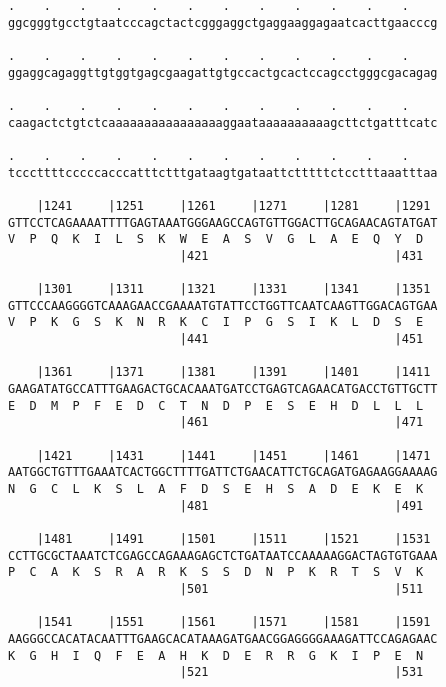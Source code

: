 \documentclass{article}
\begin{document}
\begin{Verbatim}
.    .    .    .    .    .    .    .    .    .    .    .    
ggcgggtgcctgtaatcccagctactcgggaggctgaggaaggagaatcacttgaacccg
                                                            
.    .    .    .    .    .    .    .    .    .    .    .    
ggaggcagaggttgtggtgagcgaagattgtgccactgcactccagcctgggcgacagag
                                                            
.    .    .    .    .    .    .    .    .    .    .    .    
caagactctgtctcaaaaaaaaaaaaaaaaggaataaaaaaaaaagcttctgatttcatc
                                                            
.    .    .    .    .    .    .    .    .    .    .    .    
tcccttttcccccacccatttctttgataagtgataattctttttctcctttaaatttaa
                                                            
    |1241     |1251     |1261     |1271     |1281     |1291 
GTTCCTCAGAAAATTTTGAGTAAATGGGAAGCCAGTGTTGGACTTGCAGAACAGTATGAT
V  P  Q  K  I  L  S  K  W  E  A  S  V  G  L  A  E  Q  Y  D  
                        |421                          |431  
  
    |1301     |1311     |1321     |1331     |1341     |1351 
GTTCCCAAGGGGTCAAAGAACCGAAAATGTATTCCTGGTTCAATCAAGTTGGACAGTGAA
V  P  K  G  S  K  N  R  K  C  I  P  G  S  I  K  L  D  S  E  
                        |441                          |451  
  
    |1361     |1371     |1381     |1391     |1401     |1411 
GAAGATATGCCATTTGAAGACTGCACAAATGATCCTGAGTCAGAACATGACCTGTTGCTT
E  D  M  P  F  E  D  C  T  N  D  P  E  S  E  H  D  L  L  L  
                        |461                          |471  
  
    |1421     |1431     |1441     |1451     |1461     |1471 
AATGGCTGTTTGAAATCACTGGCTTTTGATTCTGAACATTCTGCAGATGAGAAGGAAAAG
N  G  C  L  K  S  L  A  F  D  S  E  H  S  A  D  E  K  E  K  
                        |481                          |491  
  
    |1481     |1491     |1501     |1511     |1521     |1531 
CCTTGCGCTAAATCTCGAGCCAGAAAGAGCTCTGATAATCCAAAAAGGACTAGTGTGAAA
P  C  A  K  S  R  A  R  K  S  S  D  N  P  K  R  T  S  V  K  
                        |501                          |511  
  
    |1541     |1551     |1561     |1571     |1581     |1591 
AAGGGCCACATACAATTTGAAGCACATAAAGATGAACGGAGGGGAAAGATTCCAGAGAAC
K  G  H  I  Q  F  E  A  H  K  D  E  R  R  G  K  I  P  E  N  
                        |521                          |531  
  

\end{Verbatim}
\end{document}
